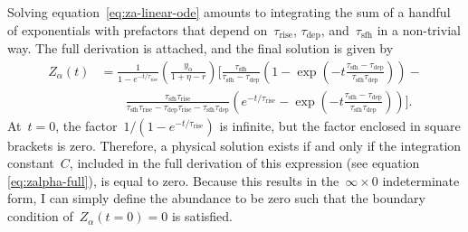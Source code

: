 \documentclass[12pt]{article}
\newcommand{\timescale}[1]{\ensuremath{\tau_\text{#1}}}
\begin{document}
Solving equation~\ref{eq:za-linear-ode} amounts to integrating the sum of a
handful of exponentials with prefactors that depend on~\timescale{rise},
\timescale{dep}, and~\timescale{sfh} in a non-trivial way.
The full derivation is attached, and the final solution is given by
\begin{equation}
\begin{split}
Z_\alpha(t) &= \frac{1}{1 - e^{-t / \timescale{rise}}}
\left(\frac{y_\alpha}{1 + \eta - r}\right)
\bigg[\frac{
	\timescale{sfh}
}{
	\timescale{sfh} - \timescale{dep}
} \left(
1 - \exp\left(-t\frac{
	\timescale{sfh} - \timescale{dep}
}{
	\timescale{sfh}\timescale{dep}
}\right)
\right) -
\\
&\qquad \frac{
	\timescale{sfh}\timescale{rise}
}{
	\timescale{sfh}\timescale{rise} - \timescale{dep}\timescale{rise} -
	\timescale{sfh}\timescale{dep}
} \left(e^{-t / \timescale{rise}} -
\exp\left(-t
\frac{
	\timescale{sfh} - \timescale{dep}
}{
	\timescale{sfh}\timescale{dep}
}
\right)
\right)\bigg].
\end{split}
\label{eq:zalpha}
\end{equation}
At~$t = 0$, the factor~$1 / (1 - e^{-t / \timescale{rise}})$ is infinite,
but the factor enclosed in square brackets is zero.
Therefore, a physical solution exists if and only if the integration
constant~$C$, included in the full derivation of this expression (see equation
\ref{eq:zalpha-full}), is equal to zero.
Because this results in the~$\infty \times 0$ indeterminate form, I can simply
define the abundance to be zero such that the boundary condition
of~$Z_\alpha(t = 0) = 0$ is satisfied.
\end{document}
